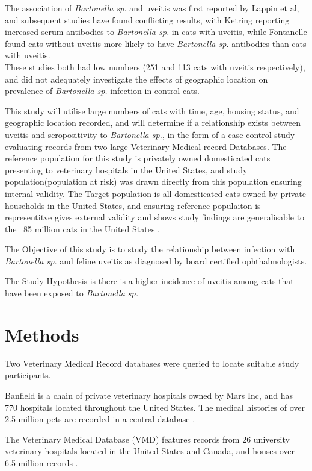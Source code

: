 \documentclass[11pt,twocolumn]{article}
\begin{document}
		The association of \emph{Bartonella sp.} and uveitis was first reported by Lappin et al\cite{Lappin1999}, and subsequent studies have found conflicting results, with Ketring reporting increased serum antibodies to \emph{Bartonella sp.} in cats with uveitis\cite{Ketring2004}, while Fontanelle found cats without uveitis more likely to have \emph{Bartonella sp.} antibodies than cats with uveitis.\\
		These studies both had low numbers (251 and 113 cats with uveitis respectively), and did not adequately investigate the effects of geographic location on prevalence of \emph{Bartonella sp.} infection in control cats.
	
		This study will utilise large numbers of cats with time, age, housing status, and geographic location recorded, and will determine if a relationship exists between uveitis and seropositivity to  \emph{Bartonella sp.}, in the form of a case control study evaluating records from two large Veterinary Medical record Databases. \cite{bark12,UniversityVeterinary}	
		The reference population for this study is privately owned domesticated cats presenting to veterinary hospitals in the United States, and study population(population at risk)  was drawn directly from this population ensuring internal validity.
		The Target population is all domesticated cats owned by private households in the United States, and ensuring reference populaiton is representitve gives external validity and shows study findings are generalisable to the ~85 million cats in the United States \cite{HSUSown}.
		

			The Objective of this study is to study the relationship between infection with \emph{Bartonella sp.} and feline uveitis as diagnosed by board certified ophthalmologists.


			The Study Hypothesis is there is a higher incidence of uveitis among cats that have been exposed to \emph{Bartonella sp.}
\section{Methods}
	Two Veterinary Medical Record databases were queried to locate suitable study participants.


	Banfield is a chain of private veterinary hospitals owned by Mars Inc, and has 770 hospitals located throughout the United States.
	The medical histories of over 2.5 million pets are recorded in a central database \cite{bark12}.


	The Veterinary Medical Database (VMD) features records from 26 university veterinary hospitals located in the United States and Canada, and houses over 6.5 million records \cite{UniversityVeterinary}.
	
\end{document}
